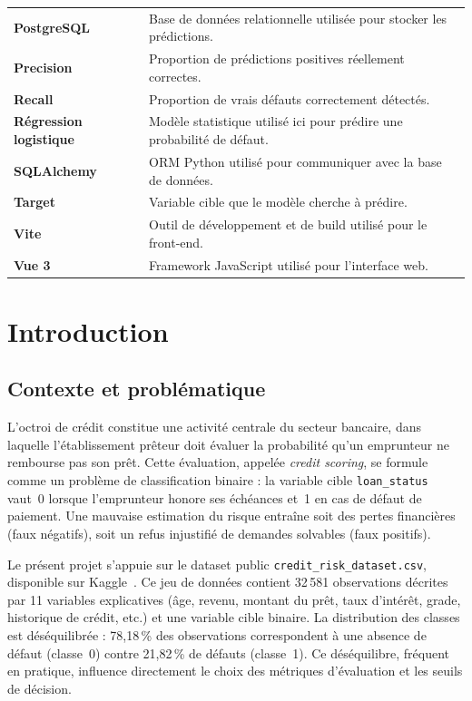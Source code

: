\documentclass[12pt,a4paper,openany]{report}
\begin{document}
{\begin{longtable}{@{}>{\bfseries}p{3.6cm} p{12cm}@{}}
    PostgreSQL            & Base de données relationnelle utilisée pour stocker les prédictions. \\
    Precision             & Proportion de prédictions positives réellement correctes. \\
    Recall                & Proportion de vrais défauts correctement détectés. \\
    Régression logistique & Modèle statistique utilisé ici pour prédire une probabilité de défaut. \\
    SQLAlchemy            & ORM Python utilisé pour communiquer avec la base de données. \\
    Target                & Variable cible que le modèle cherche à prédire. \\
    Vite                  & Outil de développement et de build utilisé pour le front-end. \\
    Vue 3                 & Framework JavaScript utilisé pour l'interface web. \\
\end{longtable}}
\clearpage

\chapter{Introduction}

\section{Contexte et problématique}

L'octroi de crédit constitue une activité centrale du secteur bancaire, dans laquelle l'établissement prêteur doit évaluer la probabilité qu'un emprunteur ne rembourse pas son prêt. Cette évaluation, appelée \emph{credit scoring}, se formule comme un problème de classification binaire : la variable cible \texttt{loan\_status} vaut~0 lorsque l'emprunteur honore ses échéances et~1 en cas de défaut de paiement. Une mauvaise estimation du risque entraîne soit des pertes financières (faux négatifs), soit un refus injustifié de demandes solvables (faux positifs).

Le présent projet s'appuie sur le dataset public \texttt{credit\_risk\_dataset.csv}, disponible sur Kaggle~\cite{kaggle-credit-risk}. Ce jeu de données contient 32\,581 observations décrites par 11 variables explicatives (âge, revenu, montant du prêt, taux d'intérêt, grade, historique de crédit, etc.) et une variable cible binaire. La distribution des classes est déséquilibrée : 78,18\,\% des observations correspondent à une absence de défaut (classe~0) contre 21,82\,\% de défauts (classe~1). Ce déséquilibre, fréquent en pratique, influence directement le choix des métriques d'évaluation et les seuils de décision.
\end{document}

